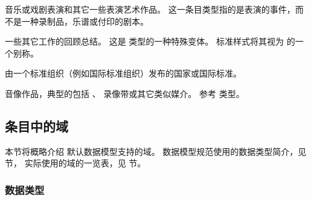 \begin{typelist}
音乐或戏剧表演和其它一些表演艺术作品。
这一条目类型指的是表演的事件，而不是一种录制品，乐谱或付印的剧本。

一些其它工作的回顾总结。
这是  类型的一种特殊变体。
标准样式将其视为  的一个别称。

由一个标准组织（例如国际标准组织）发布的国家或国际标准。

音像作品，典型的包括 、 录像带或其它类似媒介。
参考  类型。

\end{typelist}

\subsection{条目中的域}%
\label{bib:fld}


本节将概略介绍 \biblatex 默认数据模型支持的域。
数据模型规范使用的数据类型简介，见  节，
实际使用的域的一览表，见  节。

\subsubsection{数据类型}
\label{bib:fld:typ}


